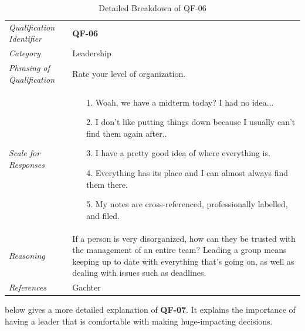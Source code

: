 \documentclass[12pt,letterpaper]{article}
\begin{document}
\begin{table}[H]
	\caption{Detailed Breakdown of QF-06}
	\begin{tabu} to 
		\toprule
		Qualification Identifier & {\bf QF-06}\\
		Category & Leadership \\
		Phrasing of Qualification & Rate your level of organization.\\
		Scale for Responses &
		\begin{minipage}[t]{\linewidth}
			\begin{enumerate}
				\item[1.] Woah, we have a midterm today? I had no idea...
				\item[2.] I don't like putting things down because I usually can't find them again after..
				\item[3.] I have a pretty good idea of where everything is.
				\item[4.] Everything has its place and I can almost always find them there.
				\item[5.] My notes are cross-referenced, professionally labelled, and filed.
			\end{enumerate}
		\end{minipage}\\
		Reasoning & If a person is very disorganized, how can they be trusted with the management of an entire team? Leading a group means keeping up to date with everything that's going on, as well as dealing with issues such as deadlines.\\
		References & Gachter\cite{gachter}\\
		\toprule
	\end{tabu}
\end{table}

\newpage{}

 below gives a more detailed explanation of {\bf QF-07}. It explains the importance of having a leader that is comfortable with making huge-impacting decisions.
\end{document}
